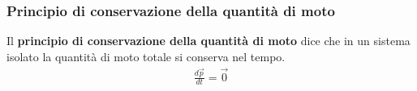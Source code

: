         \subsubsection{Principio di conservazione della quantità di moto}
            Il \textbf{principio di conservazione della quantità di moto} dice che in un sistema isolato la quantità di moto totale si conserva nel tempo.
            \begin{align*}
                \frac{d\vec{p}}{dt}=\vec{0}
            \end{align*}
